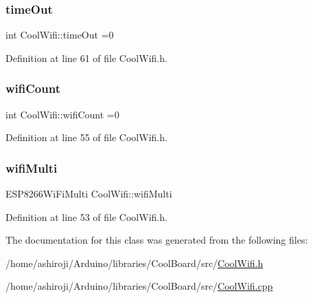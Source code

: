 \subsubsection{\texorpdfstring{time\+Out}{timeOut}}
{\footnotesize\ttfamily int Cool\+Wifi\+::time\+Out =0\hspace{0.3cm}{\ttfamily [private]}}



Definition at line 61 of file Cool\+Wifi.\+h.

\mbox{\label{class_cool_wifi_ab133bd92fcb895b884deecd6678592e4}} 
\subsubsection{\texorpdfstring{wifi\+Count}{wifiCount}}
{\footnotesize\ttfamily int Cool\+Wifi\+::wifi\+Count =0\hspace{0.3cm}{\ttfamily [private]}}



Definition at line 55 of file Cool\+Wifi.\+h.

\mbox{\label{class_cool_wifi_a7862a8c0d7239877e2956c14a368aab8}} 
\subsubsection{\texorpdfstring{wifi\+Multi}{wifiMulti}}
{\footnotesize\ttfamily E\+S\+P8266\+Wi\+Fi\+Multi Cool\+Wifi\+::wifi\+Multi\hspace{0.3cm}{\ttfamily [private]}}



Definition at line 53 of file Cool\+Wifi.\+h.



The documentation for this class was generated from the following files\+:\begin{DoxyCompactItemize}
\item 
/home/ashiroji/\+Arduino/libraries/\+Cool\+Board/src/\hyperlink{_cool_wifi_8h}{Cool\+Wifi.\+h}\item 
/home/ashiroji/\+Arduino/libraries/\+Cool\+Board/src/\hyperlink{_cool_wifi_8cpp}{Cool\+Wifi.\+cpp}\end{DoxyCompactItemize}
